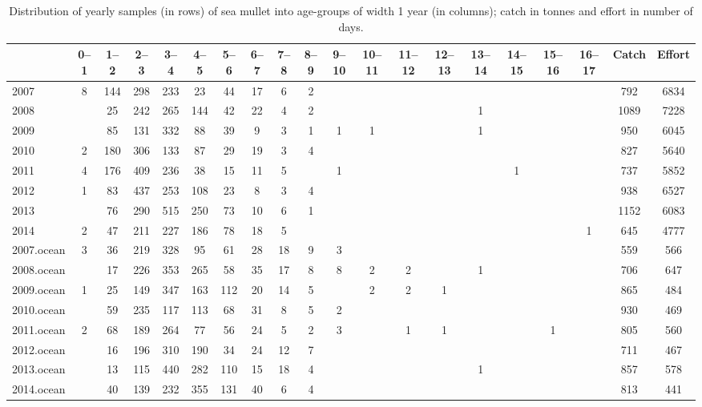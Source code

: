 \begin{sidewaystable}[ht]
\centering
\begin{tabular}{|l|c|c|c|c|c|c|c|c|c|c|c|c|c|c|c|c|c||c||c|}
  \hline
 & 0--1 & 1--2 & 2--3 & 3--4 & 4--5 & 5--6 & 6--7 & 7--8 & 8--9 & 9--10 & 10--11 & 11--12 & 12--13 & 13--14 & 14--15 & 15--16 & 16--17 & Catch & Effort \\ 
  \hline
2007 & 8 & 144 & 298 & 233 & 23 & 44 & 17 & 6 & 2 &  &  &  &  &  &  &  &  & 792 & 6834 \\ 
  2008 &  & 25 & 242 & 265 & 144 & 42 & 22 & 4 & 2 &  &  &  &  & 1 &  &  &  & 1089 & 7228 \\ 
  2009 &  & 85 & 131 & 332 & 88 & 39 & 9 & 3 & 1 & 1 & 1 &  &  & 1 &  &  &  & 950 & 6045 \\ 
  2010 & 2 & 180 & 306 & 133 & 87 & 29 & 19 & 3 & 4 &  &  &  &  &  &  &  &  & 827 & 5640 \\ 
  2011 & 4 & 176 & 409 & 236 & 38 & 15 & 11 & 5 &  & 1 &  &  &  &  & 1 &  &  & 737 & 5852 \\ 
  2012 & 1 & 83 & 437 & 253 & 108 & 23 & 8 & 3 & 4 &  &  &  &  &  &  &  &  & 938 & 6527 \\ 
  2013 &  & 76 & 290 & 515 & 250 & 73 & 10 & 6 & 1 &  &  &  &  &  &  &  &  & 1152 & 6083 \\ 
  2014 & 2 & 47 & 211 & 227 & 186 & 78 & 18 & 5 &  &  &  &  &  &  &  &  & 1 & 645 & 4777 \\ 
  2007.ocean & 3 & 36 & 219 & 328 & 95 & 61 & 28 & 18 & 9 & 3 &  &  &  &  &  &  &  & 559 & 566 \\ 
  2008.ocean &  & 17 & 226 & 353 & 265 & 58 & 35 & 17 & 8 & 8 & 2 & 2 &  & 1 &  &  &  & 706 & 647 \\ 
  2009.ocean & 1 & 25 & 149 & 347 & 163 & 112 & 20 & 14 & 5 &  & 2 & 2 & 1 &  &  &  &  & 865 & 484 \\ 
  2010.ocean &  & 59 & 235 & 117 & 113 & 68 & 31 & 8 & 5 & 2 &  &  &  &  &  &  &  & 930 & 469 \\ 
  2011.ocean & 2 & 68 & 189 & 264 & 77 & 56 & 24 & 5 & 2 & 3 &  & 1 & 1 &  &  & 1 &  & 805 & 560 \\ 
  2012.ocean &  & 16 & 196 & 310 & 190 & 34 & 24 & 12 & 7 &  &  &  &  &  &  &  &  & 711 & 467 \\ 
  2013.ocean &  & 13 & 115 & 440 & 282 & 110 & 15 & 18 & 4 &  &  &  &  & 1 &  &  &  & 857 & 578 \\ 
  2014.ocean &  & 40 & 139 & 232 & 355 & 131 & 40 & 6 & 4 &  &  &  &  &  &  &  &  & 813 & 441 \\ 
   \hline
\end{tabular}
\caption{Distribution of yearly samples (in rows) of sea mullet into age-groups of width 1 year (in columns); catch in tonnes and effort in number of days.} 
\label{tab:Mullet-NbAtAge}
\end{sidewaystable}
